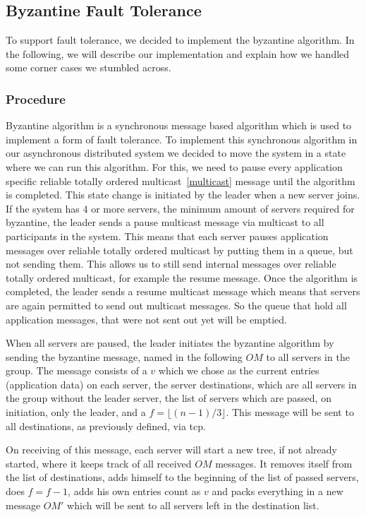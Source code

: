 \documentclass[runningheads]{llncs}
\begin{document}
\subsection{Byzantine Fault Tolerance} \label{byzantine}

To support fault tolerance, we decided to implement the byzantine algorithm. In
the following, we will describe our implementation and explain how we handled
some corner cases we stumbled across.

\subsubsection{Procedure} \label{byzantineprocedure}

Byzantine algorithm is a synchronous message based algorithm which is used to
implement a form of fault tolerance. To implement this synchronous algorithm in
our asynchronous distributed system we decided to move the system in a state
where we can run this algorithm. For this, we need to pause every application
specific reliable totally ordered multicast~\ref{multicast} message until the
algorithm is completed. This state change is initiated by the leader when a new
server joins. If the system has 4 or more servers, the minimum amount of
servers required for byzantine, the leader sends a pause multicast message via
multicast to all participants in the system. This means that each server pauses
application messages over reliable totally ordered multicast by putting them in
a queue, but not sending them. This allows us to still send internal messages
over reliable totally ordered multicast, for example the resume message. Once
the algorithm is completed, the leader sends a resume multicast message which
means that servers are again permitted to send out multicast messages. So the
queue that hold all application messages, that were not sent out yet will be
emptied.

When all servers are paused, the leader initiates the byzantine algorithm by
sending the byzantine message, named in the following $OM$ to all servers in
the group. The message consists of a $v$ which we chose as the current entries
(application data) on each server, the server destinations, which are all
servers in the group without the leader server, the list of servers which are
passed, on initiation, only the leader, and a $f = \lfloor (n - 1)/ 3 \rfloor$.
This message will be sent to all destinations, as previously defined, via tcp.

On receiving of this message, each server will start a new tree, if not already
started, where it keeps track of all received $OM$ messages. It removes itself
from the list of destinations, adds himself to the beginning of the list of
passed servers, does $f = f - 1$, adds his own entries count as $v$ and packs
everything in a new message $OM'$ which will be sent to all servers left in the
destination list.
\end{document}
